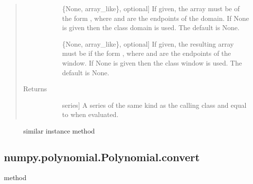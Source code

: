 \documentclass[letterpaper,10pt,english]{sphinxmanual}
\begin{document}
\begin{fulllineitems}
\begin{fulllineitems}
\begin{quote}
\begin{description}
\begin{description}
\item[{}] \leavevmode{[}\{None, array\_like\}, optional{]}
If given, the array must be of the form , where
 and  are the endpoints of the domain. If None is
given then the class domain is used. The default is None.

\item[{}] \leavevmode{[}\{None, array\_like\}, optional{]}
If given, the resulting array must be if the form
, where  and  are the endpoints of
the window. If None is given then the class window is used. The
default is None.

\end{description}

\item[{Returns}] \leavevmode\begin{description}
\item[{}] \leavevmode{[}series{]}
A series of the same kind as the calling class and equal to
 when evaluated.

\end{description}

\end{description}\end{quote}


\nopagebreak

\begin{description}
\item[{{\hyperref[\detokenize{generated/generated/numpy.polynomial.Polynomial.convert:numpy.polynomial.Polynomial.convert}]{}}}] \leavevmode
similar instance method

\end{description}



\end{fulllineitems}



\subsection{numpy.polynomial.Polynomial.convert}
\label{\detokenize{generated/generated/numpy.polynomial.Polynomial.convert:numpy-polynomial-polynomial-convert}}\label{\detokenize{generated/generated/numpy.polynomial.Polynomial.convert::doc}}
method


\end{fulllineitems}
\end{document}
